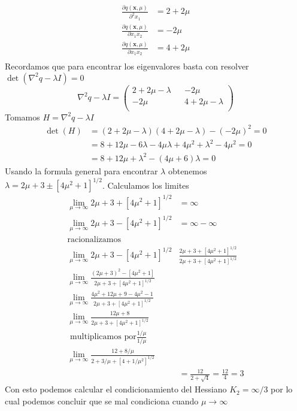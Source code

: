 \documentclass{article}
\begin{document}
\begin{multicols}{2}
\begin{align*}
\frac{\partial q(\boldsymbol{x}, \mu)}{\partial^2 x_1}   &= 2 + 2\mu\\
\frac{\partial q(\boldsymbol{x}, \mu)}{\partial x_1 x_2} &= -2\mu\\
\frac{\partial q(\boldsymbol{x}, \mu)}{\partial x_1 x_2} &= 4 + 2\mu\\
\end{align*}
Recordamos que para encontrar los eigenvalores basta con resolver $\det(\nabla^2q - \lambda I) = 0$
$$
\nabla^2q - \lambda I= 
 \begin{pmatrix}
  2 + 2\mu -\lambda && -2\mu\\
  -2\mu             && 4 + 2\mu - \lambda\\
 \end{pmatrix}
$$
Tomamos $H = \nabla^2q - \lambda I$
\begin{align*}
\det(H) &= (2 + 2\mu -\lambda)(4+2\mu - \lambda) - (-2\mu)^2 = 0\\
&= 8+12\mu-6\lambda-4\mu\lambda+4\mu^2+\lambda^2 - 4\mu^2 = 0\\
&= 8+12\mu + \lambda^2 - (4\mu+6)\lambda = 0
\end{align*}
Usando la formula general para encontrar $\lambda$ obtenemos $\lambda = 2\mu + 3 \pm [4\mu^2 + 1]^{1/2}$. Calculamos los limites
\begin{align*}
\lim_{\mu\rightarrow\infty} 2\mu + 3 + [4\mu^2 + 1]^{1/2} &= \infty\\
\lim_{\mu\rightarrow\infty} 2\mu + 3 - [4\mu^2 + 1]^{1/2} &= \infty - \infty\\
\text{racionalizamos}\\
\lim_{\mu\rightarrow\infty} 2\mu + 3 - [4\mu^2 + 1]^{1/2} &\frac{2\mu + 3 + [4\mu^2 + 1]^{1/2}}{2\mu + 3 + [4\mu^2 + 1]^{1/2}}\\
\lim_{\mu\rightarrow\infty} \frac{(2\mu + 3)^2 - [4\mu^2 + 1]}{2\mu + 3 + [4\mu^2 + 1]^{1/2}}\\
\lim_{\mu\rightarrow\infty} \frac{4\mu^2 + 12\mu +9 - 4\mu^2 - 1}{2\mu + 3 + [4\mu^2 + 1]^{1/2}}\\
\lim_{\mu\rightarrow\infty} \frac{12\mu +8}{2\mu + 3 + [4\mu^2 + 1]^{1/2}}\\
\text{ multiplicamos por} \frac{1/\mu}{1/\mu}\\
\lim_{\mu\rightarrow\infty} \frac{12 +8/\mu}{2 + 3/\mu + [4 + 1/\mu^2]^{1/2}}\\
&= \frac{12}{2+\sqrt{4}} = \frac{12}{4}= 3
\end{align*}
Con esto podemos calcular el condicionamiento del Hessiano $K_2 = \infty/3$ por lo cual podemos concluir que se mal condiciona cuando $\mu \rightarrow \infty$


\end{multicols}
\end{document}
